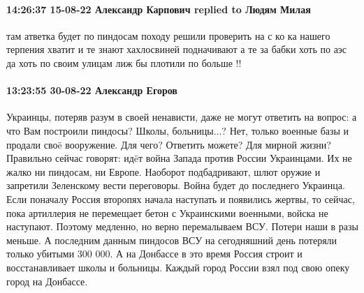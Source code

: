  
 
 
 
 

\paragraph{14:26:37 15-08-22 Александр Карпович replied to Людям Милая}

там атветка будет по пиндосам походу решили проверить на с ко ка нашего
терпения хватит и те знают хахлосвиней подначивают а те за бабки хоть по аэс да
хоть по своим улицам лиж бы плотили по больше !!

\paragraph{13:23:55 30-08-22 Александр Егоров}

Украинцы, потеряв разум в своей ненависти, даже не могут ответить на вопрос: а что Вам построили пиндосы?
Школы, больницы...?
Нет, только военные базы и продали своë вооружение.
Для чего?
Ответить можете?
Для мирной жизни?
Правильно сейчас говорят: идëт война Запада против России Украинцами.
Их не жалко ни пиндосам, ни Европе.
Наоборот подбадривают, шлют оружие и запретили Зеленскому вести переговоры.
Война будет до последнего Украинца.
Если поначалу Россия второпях начала наступать и появились жертвы, то сейчас, пока артиллерия не перемещает бетон с Украинскими военными, войска не наступают.
Поэтому медленно, но верно перемалываем ВСУ. Потери наши в разы меньше.
А последним данным пиндосов ВСУ на сегодняшний день потеряли только убитыми 300 000.
А на Донбассе в это время Россия строит и восстанавливает школы и больницы.
Каждый город России взял под свою опеку город на Донбассе.
